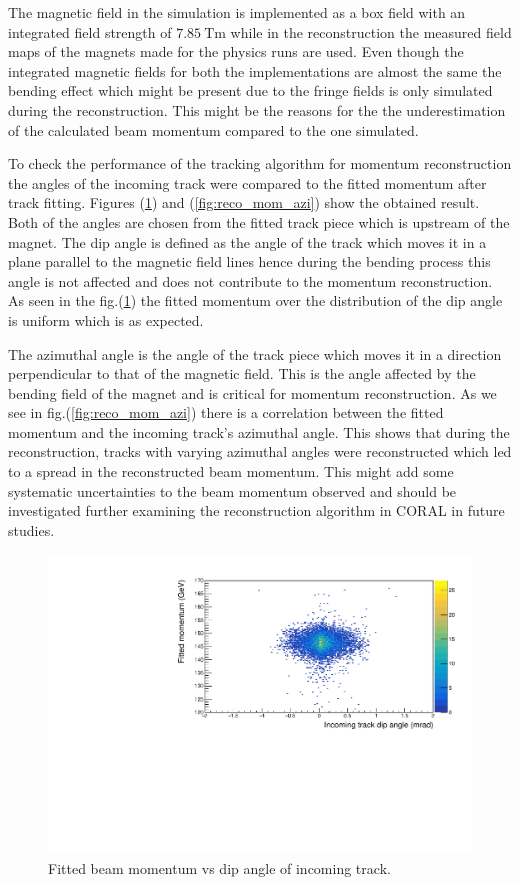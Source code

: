 The magnetic field in the simulation is implemented as a box field with an integrated field strength of $7.85~\text{Tm}$ while in the reconstruction the measured field maps of the magnets made for the physics runs are used. Even though the integrated magnetic fields for both the implementations are almost the same the bending effect which might be present due to the fringe fields is only simulated during the reconstruction. This might be the reasons for the the underestimation of the calculated beam momentum compared to the one simulated.

To check the performance of the tracking algorithm for momentum reconstruction the angles of the incoming track were compared to the fitted momentum after track fitting. Figures (\ref{fig:reco_mom_dip}) and (\ref{fig:reco_mom_azi}) show the obtained result. Both of the angles are chosen from the fitted track piece which is upstream of the magnet. The dip angle is defined as the angle of the track which moves it in a plane parallel to the magnetic field lines hence during the bending process this angle is not affected and does not contribute to the momentum reconstruction. As seen in the fig.(\ref{fig:reco_mom_dip}) the fitted momentum over the distribution of the dip angle is uniform which is as expected.

The azimuthal angle is the angle of the track piece which moves it in a direction perpendicular to that of the magnetic field. This is the angle affected by the bending field of the magnet and is critical for momentum reconstruction. As we see in fig.(\ref{fig:reco_mom_azi}) there is a correlation between the fitted momentum and the incoming track's azimuthal angle. This shows that during the reconstruction, tracks with varying azimuthal angles were reconstructed which led to a spread in the reconstructed beam momentum. This might add some systematic uncertainties to the beam momentum observed and should be investigated further examining the reconstruction algorithm in CORAL in future studies.

 \begin{figure}[t!]
 \centering
 \includegraphics[width=\textwidth]{thesis_figures/MC_reco/mom_vs_dip.pdf}
 \caption{Fitted beam momentum vs dip angle of incoming track. }
 \label{fig:reco_mom_dip}
 \end{figure}

